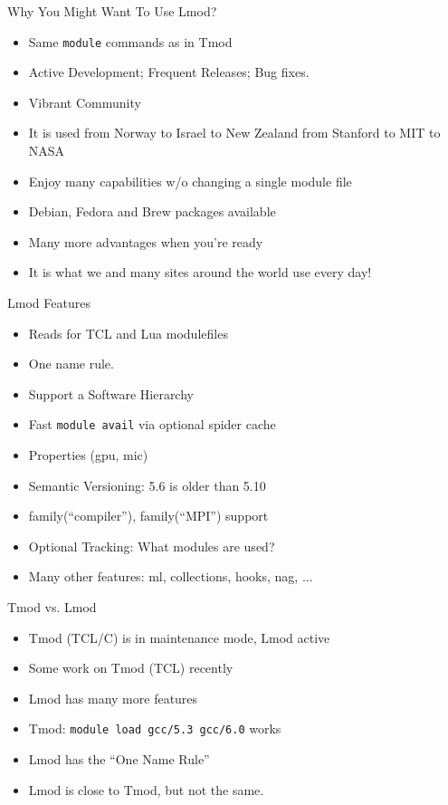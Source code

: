 \documentclass[dvipsnames,aspectratio=169]{beamer}
\begin{document}
\begin{frame}{Why You Might Want To Use Lmod?}
  \begin{itemize}
    \item Same \texttt{module} commands as in Tmod
    \item Active Development;  Frequent Releases; Bug fixes.
    \item Vibrant Community
    \item It is used from Norway to Israel to New Zealand from Stanford to MIT to NASA
    \item Enjoy many capabilities w/o changing a single module file
    \item Debian, Fedora and Brew packages available
    \item Many more advantages when you're ready
    \item It is what we and many sites around the world use every day!
  \end{itemize}
\end{frame}

\begin{frame}{Lmod Features}
  \begin{itemize}
    \item Reads for TCL and Lua modulefiles
    \item One name rule.
    \item Support a Software Hierarchy
    \item Fast \texttt{module avail} via optional spider cache 
    \item Properties (gpu, mic)
    \item Semantic Versioning:  5.6 is older than 5.10
    \item family(``compiler''), family(``MPI'') support
    \item Optional Tracking: What modules are used?
    \item Many other features: ml, collections, hooks, nag, ...
  \end{itemize}
\end{frame}

\begin{frame}{Tmod vs. Lmod}
  \begin{itemize}
    \item Tmod (TCL/C) is in maintenance mode, Lmod active
    \item Some work on Tmod (TCL) recently
    \item Lmod has many more features
    \item Tmod: \texttt{module load gcc/5.3 gcc/6.0} works
    \item Lmod has the ``One Name Rule''
    \item Lmod is close to Tmod, but not the same.
  \end{itemize}
\end{frame}
\end{document}
